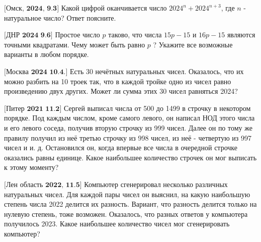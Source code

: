 $\bigl[\textbf{Омск, 2024, 9.3}\bigr]$
Какой цифрой оканчивается число $2024^n+2024^{n+3}$, где $n$ - натуральное число? Ответ поясните.

$\bigl[\textbf{ДНР 2024 9.6}\bigr]$
Простое число $p$ таково, что числа $15 p-15$ и $16 p-15$ являются точными квадратами. Чему может быть равно $p$ ? Укажите все возможные варианты в любом порядке.

$\bigl[\textbf{Москва 2024 10.4.}\bigr]$ Есть 30 нечётных натуральных чисел. Оказалось, что их можно разбить на 10 троек так, что в каждой тройке одно из чисел равно произведению двух других. Может ли сумма этих 30 чисел равняться 2024?

$\bigl[\textbf{Питер 2021 11.2}\bigr]$
Сергей выписал числа от 500 до 1499 в строчку в некотором порядке. Под каждым числом, кроме самого левого, он написал НОД этого числа и его левого соседа, получив вторую строчку из 999 чисел. Далее он по тому же правилу получил из неё третью строчку из 998 чисел, из неё - четвертую из 997 чисел и и. д. Остановился он, когда впервые все числа в очередной строчке оказались равны единице. Какое наибольшее количество строчек он мог выписать к этому моменту?

$\bigl[\textbf{Лен область 2022, 11.5}\bigr]$
Компьютер сгенерировал несколько различных натуральных чисел. Для каждой пары чисел он выяснил, на какую наибольшую степень числа 2022 делится их разность. Вариант, что разность делится только на нулевую степень, тоже возможен. Оказалось, что разных ответов у компьютера получилось 2023. Какое наибольшее количество чисел мог сгенерировать компьютер?